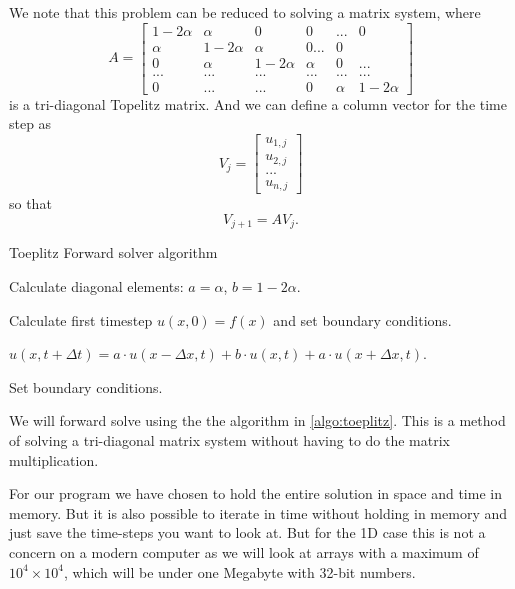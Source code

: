 We note that this problem can be reduced to solving a matrix system, where
$$
    A=
    \begin{bmatrix}
        1-2\alpha & \alpha & 0 & 0 & ... & 0 \\
        \alpha    & 1-2\alpha & \alpha & 0 ... & 0 \\
        0 & \alpha & 1-2\alpha & \alpha & 0 & ... \\
        ... & ... & ... & ... & ... & ... \\
        0 & ... & ... & 0 & \alpha & 1-2\alpha
    \end{bmatrix}
$$
is a tri-diagonal Topelitz matrix. And we can define a column vector for the
time step as
$$
    V_j = 
    \begin{bmatrix}
        u_{1,j}\\
        u_{2,j}\\
        ...\\
        u_{n,j}
    \end{bmatrix}
$$
so that
\begin{equation}
    V_{j+1} = AV_j.
\end{equation}


\begin{algorithm}
    \caption{Toeplitz Forward solver algorithm}\label{algo:toeplitz}
    \begin{algorithmic}
        
        
        
        
        Calculate diagonal elements: $a=\alpha$, $b=1-2\alpha$.
    
        Calculate first timestep $u(x,0)=f(x)$ and set boundary conditions.
    
            
            $u(x, t+\Delta t) = a \cdot u(x-\Delta x, t) + b\cdot u(x,
            t) + a \cdot u(x+\Delta x, t)$.
    
            Set boundary conditions.
        \EndWhile
    
    \end{algorithmic}
    \end{algorithm}
    
    We will forward solve using the the algorithm in \ref{algo:toeplitz}. This is a
    method of solving a tri-diagonal matrix system without having to do the matrix
    multiplication. 
    
    For our program we have chosen to hold the entire solution in space and time in
    memory. But it is also possible to iterate in time without holding in memory
    and just save the time-steps you want to look at. But for the 1D case this is
    not a concern on a modern computer as we will look at arrays with a maximum of
    $10^4\times 10^4$, which will be under one Megabyte with 32-bit numbers.
    
